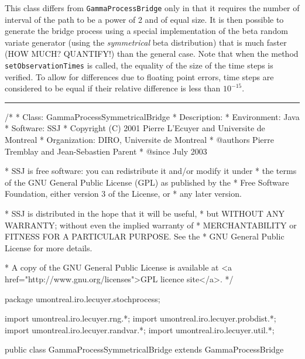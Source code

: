 
This class differs from \texttt{GammaProcessBridge} only in that it requires
the number of interval of the path to be
a power of 2 and of equal size.
It is then possible to generate the bridge process using
a special implementation of the beta random variate generator
(using the \emph{symmetrical} beta distribution)
that is much faster (HOW MUCH? QUANTIFY!) than the general case.
Note that when the method \texttt{setObservationTimes} is called,
the equality of the size of the time steps is verified.
To allow for differences due to floating point errors, time steps
are considered to be equal if their relative difference is less
than $10^{-15}$.
\bigskip\hrule\bigskip

\begin{code}
\begin{hide}
/*
 * Class:        GammaProcessSymmetricalBridge
 * Description:
 * Environment:  Java
 * Software:     SSJ
 * Copyright (C) 2001  Pierre L'Ecuyer and Universite de Montreal
 * Organization: DIRO, Universite de Montreal
 * @authors      Pierre Tremblay and Jean-Sebastien Parent
 * @since        July 2003

 * SSJ is free software: you can redistribute it and/or modify it under
 * the terms of the GNU General Public License (GPL) as published by the
 * Free Software Foundation, either version 3 of the License, or
 * any later version.

 * SSJ is distributed in the hope that it will be useful,
 * but WITHOUT ANY WARRANTY; without even the implied warranty of
 * MERCHANTABILITY or FITNESS FOR A PARTICULAR PURPOSE.  See the
 * GNU General Public License for more details.

 * A copy of the GNU General Public License is available at
   <a href="http://www.gnu.org/licenses">GPL licence site</a>.
 */
\end{hide}
package umontreal.iro.lecuyer.stochprocess;\begin{hide}
import umontreal.iro.lecuyer.rng.*;
import umontreal.iro.lecuyer.probdist.*;
import umontreal.iro.lecuyer.randvar.*;
import umontreal.iro.lecuyer.util.*;

\end{hide}

public class GammaProcessSymmetricalBridge extends GammaProcessBridge \begin{hide} {
    protected BetaSymmetricalGen BSgen;
\end{hide}
\end{code}
